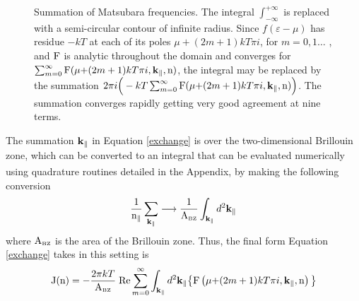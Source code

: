 \documentclass[a4paper, 12pt]{article}
\begin{document}
\begin{figure}[H]
\caption{\footnotesize
	Summation of Matsubara frequencies. The integral $\int_{-\infty}^{+\infty}$ is replaced with a semi-circular contour of infinite radius. Since $f(\varepsilon - \mu)$ has residue $-kT$ at each of its poles $\mu + (2m+1)kT\pi i$, for $m=0,1\dots$ , and $\rm F$ is analytic throughout the domain and converges for $\sum_{m=0}^\infty {\rm F}(\mu{ + (2m+1)kT\pi i}, \rm\bf k_\parallel, \rm n)$, the integral may be replaced by the summation 
	$2\pi i\Big(-kT\sum_{m=0}^\infty {\rm F}(\mu{ + (2m+1)kT\pi i}, \rm\bf k_\parallel, \rm n)\Big)$. The summation converges rapidly getting very good agreement at nine terms.
	}\label{fig:4th}
	
\end{figure}
The summation $\rm\bf k_\parallel$ in Equation \eqref{exchange} is over the two-dimensional Brillouin zone, which can be converted to an integral that can be evaluated numerically using quadrature routines detailed in the Appendix\textcolor{blue}{\textsuperscript{\cite{CP}}}, by making the following conversion
\begin{equation}\label{sum}
	\frac{1}{\rm n_\parallel}\sum_{\bf k_\parallel} \longrightarrow \frac{1}{\rm A_{\scriptscriptstyle BZ}} \int_{\bf k_\parallel}d^2 \bf k_\parallel
\end{equation}	
where $\rm A_{\scriptscriptstyle BZ}$ is the area of the Brillouin zone.
Thus, the final form Equation \eqref{exchange} takes in this setting is
\begin{equation}
	{\rm{J(n)}}=-\frac{2\pi kT}{\rm A_{\scriptscriptstyle BZ}} \; {\rm Re}\sum_{m=0}^\infty\int_{\rm\bf k_\parallel} d^2 {\rm\bf k_\parallel}\big\{ {\rm F}\left(\mu{ + (2m+1)kT\pi i}, \rm\bf k_\parallel, \rm n\right)\big\}
\end{equation}
\end{document}
